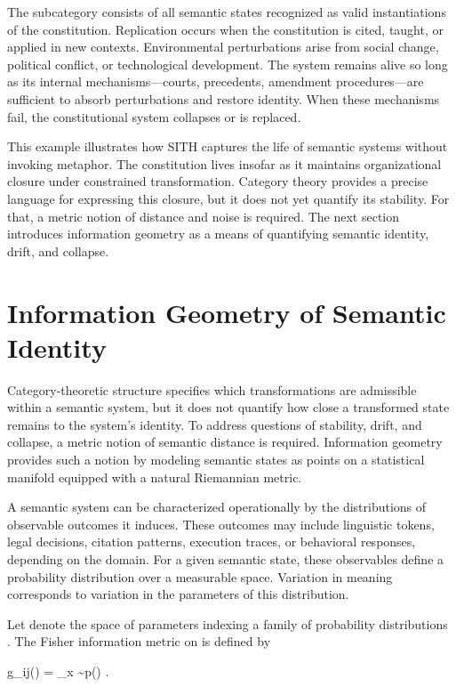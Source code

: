\documentclass[11pt,oneside]{article}
\begin{document}
The subcategory consists of all semantic states recognized as valid instantiations of the constitution. Replication occurs when the constitution is cited, taught, or applied in new contexts. Environmental perturbations arise from social change, political conflict, or technological development. The system remains alive so long as its internal mechanisms—courts, precedents, amendment procedures—are sufficient to absorb perturbations and restore identity. When these mechanisms fail, the constitutional system collapses or is replaced.

This example illustrates how SITH captures the life of semantic systems without invoking metaphor. The constitution lives insofar as it maintains organizational closure under constrained transformation. Category theory provides a precise language for expressing this closure, but it does not yet quantify its stability. For that, a metric notion of distance and noise is required. The next section introduces information geometry as a means of quantifying semantic identity, drift, and collapse.


\section{Information Geometry of Semantic Identity}

Category-theoretic structure specifies which transformations are admissible within a semantic system, but it does not quantify how close a transformed state remains to the system’s identity. To address questions of stability, drift, and collapse, a metric notion of semantic distance is required. Information geometry provides such a notion by modeling semantic states as points on a statistical manifold equipped with a natural Riemannian metric.

A semantic system can be characterized operationally by the distributions of observable outcomes it induces. These outcomes may include linguistic tokens, legal decisions, citation patterns, execution traces, or behavioral responses, depending on the domain. For a given semantic state, these observables define a probability distribution over a measurable space. Variation in meaning corresponds to variation in the parameters of this distribution.

Let  denote the space of parameters indexing a family of probability distributions . The Fisher information metric on  is defined by

g_{ij}(\theta) = _{x \sim p(\cdot \mid \theta)} .
\end{document}

